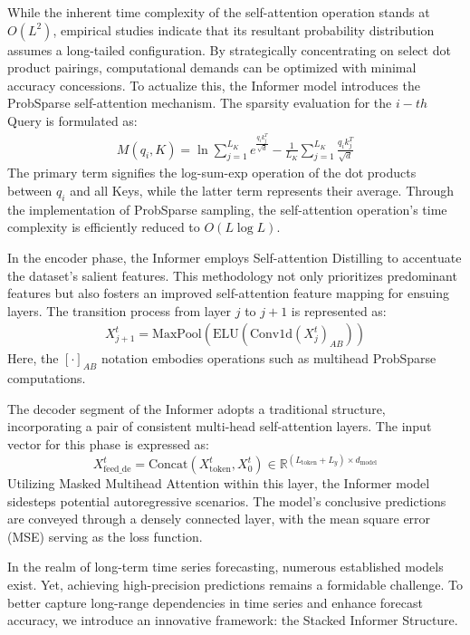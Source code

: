 \documentclass[sn-mathphys,Numbered]{sn-jnl}
\theoremstyle{thmstyleone}%
\theoremstyle{thmstyletwo}%
\theoremstyle{thmstylethree}%
\begin{document}
While the inherent time complexity of the self-attention operation stands at \( O(L^2) \), empirical studies indicate that its resultant probability distribution assumes a long-tailed configuration. By strategically concentrating on select dot product pairings, computational demands can be optimized with minimal accuracy concessions. To actualize this, the Informer model introduces the ProbSparse self-attention mechanism. The sparsity evaluation for the \( i-th \) Query is formulated as:
\begin{align}
M(q_i, K) = \ln \sum_{j=1}^{L_K} e^{\frac{q_i k_j^T}{\sqrt{d}}} - \frac{1}{L_K} \sum_{j=1}^{L_K} \frac{q_i k_j^T}{\sqrt{d}}
\end{align}
The primary term signifies the log-sum-exp operation of the dot products between \( q_i \) and all Keys, while the latter term represents their average. Through the implementation of ProbSparse sampling, the self-attention operation's time complexity is efficiently reduced to \( O(L\log L) \).

In the encoder phase, the Informer employs Self-attention Distilling to accentuate the dataset's salient features. This methodology not only prioritizes predominant features but also fosters an improved self-attention feature mapping for ensuing layers. The transition process from layer \( j \) to \( j+1 \) is represented as:
\begin{align}
X_{j+1}^t = \text{MaxPool}\left(\text{ELU}\left(\text{Conv1d}\left(X_{j}^{t}\right)_{AB}\right)\right)
\end{align}
Here, the \( [·]_{AB} \) notation embodies operations such as multihead ProbSparse computations.

The decoder segment of the Informer adopts a traditional structure, incorporating a pair of consistent multi-head self-attention layers. The input vector for this phase is expressed as:
\begin{equation}
X_{\text{feed\_de}}^t = \text{Concat}\left(X_{\text{token}}^t, X_0^t\right) \in \mathbb{R}^{\left(L_{\text{token}} + L_y\right) \times d_{\text{model}}}
\end{equation}
Utilizing Masked Multihead Attention within this layer, the Informer model sidesteps potential autoregressive scenarios. The model's conclusive predictions are conveyed through a densely connected layer, with the mean square error (MSE) serving as the loss function.


In the realm of long-term time series forecasting, numerous established models exist. Yet, achieving high-precision predictions remains a formidable challenge. To better capture long-range dependencies in time series and enhance forecast accuracy, we introduce an innovative framework: the Stacked Informer Structure.
\end{document}
